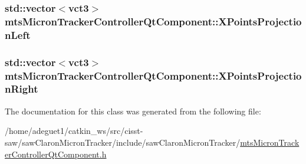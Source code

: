 \hypertarget{classmts_micron_tracker_controller_qt_component_ab4435aec94942d35c86ade1c60047405}{
\subsubsection[{X\-Points\-Projection\-Left}]{\setlength{\rightskip}{0pt plus 5cm}std\-::vector$<${\bf vct3}$>$ mts\-Micron\-Tracker\-Controller\-Qt\-Component\-::\-X\-Points\-Projection\-Left}}\label{classmts_micron_tracker_controller_qt_component_ab4435aec94942d35c86ade1c60047405}
\hypertarget{classmts_micron_tracker_controller_qt_component_a638d175869aa0a701bc334bfa7d03590}{
\subsubsection[{X\-Points\-Projection\-Right}]{\setlength{\rightskip}{0pt plus 5cm}std\-::vector$<${\bf vct3}$>$ mts\-Micron\-Tracker\-Controller\-Qt\-Component\-::\-X\-Points\-Projection\-Right}}\label{classmts_micron_tracker_controller_qt_component_a638d175869aa0a701bc334bfa7d03590}


The documentation for this class was generated from the following file\-:\begin{DoxyCompactItemize}
\item 
/home/adeguet1/catkin\-\_\-ws/src/cisst-\/saw/saw\-Claron\-Micron\-Tracker/include/saw\-Claron\-Micron\-Tracker/\hyperlink{mts_micron_tracker_controller_qt_component_8h}{mts\-Micron\-Tracker\-Controller\-Qt\-Component.\-h}\end{DoxyCompactItemize}
